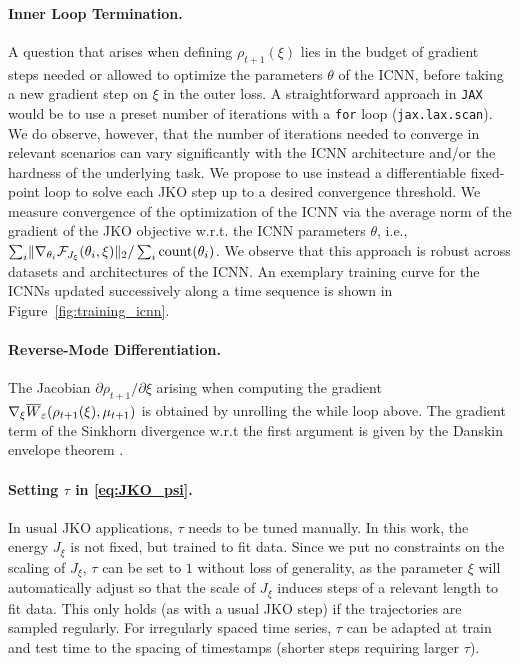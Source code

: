 \newpage
\paragraph{Inner Loop Termination.} A question that arises when defining $\rho_{t+1}(\xi)$ lies in the budget of gradient steps needed or allowed to optimize the parameters $\theta$ of the ICNN, before taking a new gradient step on $\xi$ in the outer loss. A straightforward approach in \texttt{JAX} \citep{jax2018github} would be to use a preset number of iterations with a \texttt{for} loop (\texttt{jax.lax.scan}). 
We do observe, however, that the number of iterations needed to converge in relevant scenarios can vary significantly with the ICNN architecture and/or the hardness of the underlying task.
We propose to use instead a differentiable fixed-point loop to solve each JKO step up to a desired convergence threshold.
We measure convergence of the optimization of the ICNN via the average norm of the gradient of the JKO objective w.r.t. the ICNN parameters $\theta$, i.e., $\sum_i \lVert\nabla_{\theta_i}\mathcal{F}_{J_\xi}(\theta_i, \xi)\rVert_2/\sum_i \text{count}(\theta_i)$.
We observe that this approach is robust across datasets and architectures of the ICNN. An exemplary training curve for the ICNNs updated successively along a time sequence is shown in Figure~\ref{fig:training_icnn}.

\paragraph{Reverse-Mode Differentiation.} The Jacobian $\partial \rho_{t+1} / \partial\xi$ arising when computing the gradient $\nabla_\xi \overline{W}_{\varepsilon}(\rho_{t+1}(\xi), \mu_{t+1})$ is obtained by unrolling the while loop above. The gradient term of the Sinkhorn divergence w.r.t the first argument is given by the Danskin envelope theorem \citep{danskin2012theory}.


\paragraph{Setting $\tau$ in \eqref{eq:JKO_psi}.} 
In usual JKO applications, $\tau$ needs to be tuned manually. In this work, the energy $J_\xi$ is not fixed, but trained to fit data. Since we put no constraints on the scaling of $J_\xi$, $\tau$ can be set to $1$ without loss of generality, as the parameter $\xi$ will automatically adjust so that the scale of $J_\xi$ induces steps of a relevant length to fit data. This only holds (as with a usual JKO step) if the trajectories are sampled regularly. For irregularly spaced time series, $\tau$ can be adapted at train and test time to the spacing of timestamps (shorter steps requiring larger $\tau$).


